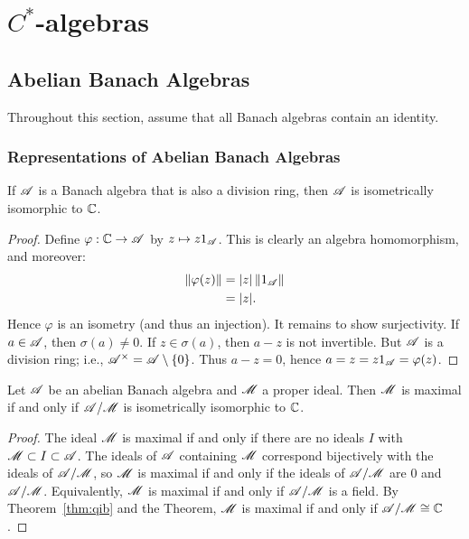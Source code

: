 \chapter{$C^\ast$-algebras}

\section{Abelian Banach Algebras}

\noindent Throughout this section, assume that all Banach algebras contain an identity.

\subsection{Representations of Abelian Banach Algebras}

\begin{theorem}\label{thm:gm}
	If $\mathscr{A}$ is a Banach algebra that is also a division ring, then $\mathscr{A}$ is isometrically isomorphic to $\mathbb{C}$. 
\end{theorem}
	\begin{proof}
		Define $\varphi:\mathbb{C} \rightarrow \mathscr{A}$ by $z \mapsto z 1_{\mathscr{A}}$. This is clearly an algebra homomorphism, and moreover:
		\begin{align*}
			\left\lVert \varphi(z) \right\rVert
			&= |z| \left\lVert 1_{\mathscr{A}} \right\rVert \\
			&= |z|.
		\end{align*}
		Hence $\varphi$ is an isometry (and thus an injection). It remains to show surjectivity. If $a \in \mathscr{A}$, then $\sigma(a) \neq 0$. If $z \in \sigma(a)$, then $a-z$ is not invertible. But $\mathscr{A}$ is a division ring; i.e., $\mathscr{A}^\times = \mathscr{A} \setminus \{0\}$. Thus $a-z = 0$, hence $a = z = z 1_{\mathscr{A}} = \varphi(z)$.
	\end{proof}

\begin{corollary}\label{cor:max-iff-c}
	Let $\mathscr{A}$ be an abelian Banach algebra and $\mathscr{M}$ a proper ideal. Then $\mathscr{M}$ is maximal if and only if $\mathscr{A}/\mathscr{M}$ is isometrically isomorphic to $\mathbb{C}$.
\end{corollary}
	\begin{proof}
		The ideal $\mathscr{M}$ is maximal if and only if there are no ideals $I$ with $\mathscr{M} \subset I \subset \mathscr{A}$. The ideals of $\mathscr{A}$ containing $\mathscr{M}$ correspond bijectively with the ideals of $\mathscr{A}/\mathscr{M}$, so $\mathscr{M}$ is maximal if and only if the ideals of $\mathscr{A}/\mathscr{M}$ are $0$ and $\mathscr{A}/\mathscr{M}$. Equivalently, $\mathscr{M}$ is maximal if and only if $\mathscr{A}/\mathscr{M}$ is a field. By Theorem~\ref{thm:qib} and the  Theorem, $\mathscr{M}$ is maximal if and only if $\mathscr{A}/\mathscr{M} \cong \mathbb{C}$.
	\end{proof}

